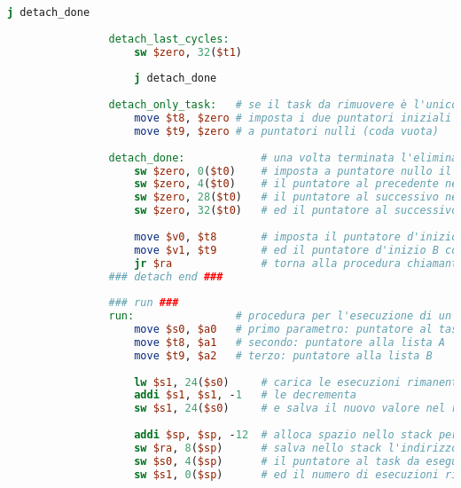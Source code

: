 \begin{center}
\begin{lstlisting}[language=mips, gobble=14, stepnumber=1]
                    j detach_done
                    
                detach_last_cycles:
                    sw $zero, 32($t1)
                
                    j detach_done
                    
                detach_only_task:   # se il task da rimuovere è l'unico presente nelle due code
                    move $t8, $zero # imposta i due puntatori iniziali delle liste A e B
                    move $t9, $zero # a puntatori nulli (coda vuota)
                    
                detach_done:            # una volta terminata l'eliminazione dalle due liste
                    sw $zero, 0($t0)    # imposta a puntatore nullo il precedente, nella lista A, del task rimosso
                    sw $zero, 4($t0)    # il puntatore al precedente nella lista B
                    sw $zero, 28($t0)   # il puntatore al successivo nella lista A
                    sw $zero, 32($t0)   # ed il puntatore al successivo nella lista B
                
                    move $v0, $t8       # imposta il puntatore d'inizio A come primo valore di ritorno
                    move $v1, $t9       # ed il puntatore d'inizio B come secondo valore di ritorno
                    jr $ra              # torna alla procedura chiamante
                ### detach end ###
                
                ### run ###
                run:                # procedura per l'esecuzione di un task
                    move $s0, $a0   # primo parametro: puntatore al task da eseguire
                    move $t8, $a1   # secondo: puntatore alla lista A
                    move $t9, $a2   # terzo: puntatore alla lista B
                    
                    lw $s1, 24($s0)     # carica le esecuzioni rimanenti del task
                    addi $s1, $s1, -1   # le decrementa
                    sw $s1, 24($s0)     # e salva il nuovo valore nel record del task
                    
                    addi $sp, $sp, -12  # alloca spazio nello stack per 12 byte (3 word)
                    sw $ra, 8($sp)      # salva nello stack l'indirizzo di ritorno
                    sw $s0, 4($sp)      # il puntatore al task da eseguire
                    sw $s1, 0($sp)      # ed il numero di esecuzioni rimanenti dopo la sua esecuzione
                    

\end{lstlisting}
\end{center}
